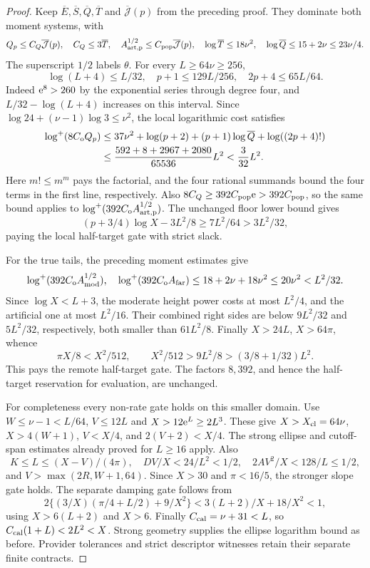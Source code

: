 \begin{proof}
Keep \(\overline E,\overline S,\overline Q,\overline T\) and
\(\overline{\mathcal J}(p)\) from the preceding proof.
They dominate both moment systems, with
\[
 Q_p\le C_Q\overline{\mathcal J}(p),\quad C_Q\le3\overline T,
 \quad A_{\rm art,p}^{1/2}\le C_{\rm pop}\overline{\mathcal J}(p),
 \quad \log\overline T\le18\nu^2,\quad
 \log\overline Q\le15+2\nu\le23\nu/4.
\]
The superscript \(1/2\) labels \(\theta\).
For every \(L\ge64\nu\ge256\),
\begin{equation}
 \log(L+4)\le L/32,\quad p+1\le129L/256,\quad
 2p+4\le65L/64.
 \label{eq:linear-elementary-bounds}
\end{equation}
Indeed \(\mathrm e^8>260\) by the exponential series through degree four,
and \(L/32-\log(L+4)\) increases on this interval.
Since \(\log24+(\nu-1)\log3\le\nu^2\),
the local logarithmic cost satisfies
\begin{align}
 \log^{+}(8C_{\mathrm o}Q_p)
 &\le37\nu^2+\log(p+2)+(p+1)\log\overline Q
                         +\log((2p+4)!)\nonumber\\
 &\le\frac{592+8+2967+2080}{65536}L^2
   <\frac3{32}L^2.
 \label{eq:linear-local-cost}
\end{align}
Here \(m!\le m^m\) pays the factorial, and the four rational
summands bound the four terms in the first line, respectively.
Also \(8C_Q\ge392C_{\rm pop}\mathrm e>392C_{\rm pop}\), so the same
bound applies to \(\log^{+}(392C_{\mathrm o}A_{\rm art,p}^{1/2})\).
The unchanged floor lower bound gives
\[
 (p+3/4)\log X-3L^2/8\ge7L^2/64>3L^2/32,
\]
paying the local half-target gate with strict slack.

For the true tails, the preceding moment estimates give
\[
 \log^{+}(392C_{\mathrm o}A_{\rm mod}^{1/2}),\quad
 \log^{+}(392C_{\mathrm o}A_{\rm far})
 \le18+2\nu+18\nu^2\le20\nu^2<L^2/32.
\]
Since \(\log X<L+3\), the moderate height power costs at most
\(L^2/4\), and the artificial one at most \(L^2/16\).
Their combined right sides are below \(9L^2/32\) and \(5L^2/32\),
respectively, both smaller than \(61L^2/8\).
Finally \(X>24L\), \(X>64\pi\), whence
\[
 \pi X/8<X^2/512,\qquad
 X^2/512>9L^2/8>(3/8+1/32)L^2.
\]
This pays the remote half-target gate. The factors \(8,392\),
and hence the half-target reservation for evaluation, are unchanged.

For completeness every non-rate gate holds on this smaller domain.
Use \(W\le\nu-1<L/64\), \(V\le12L\) and
\(X>12\mathrm e^L\ge2L^3\).
These give \(X>X_{\rm cl}=64\nu\), \(X>4(W+1)\),
\(V<X/4\), and \(2(V+2)<X/4\).
The strong ellipse and cutoff-span estimates already proved for
\(L\ge16\) apply. Also
\[
 K\le L\le(X-V)/(4\pi),\quad
 DV/X<24/L^2<1/2,\quad 2AV^2/X<128/L\le1/2,
\]
and \(V>\max(2R,W+1,64)\).
Since \(X>30\) and \(\pi<16/5\), the stronger slope gate holds.
The separate damping gate follows from
\[
 2\{(3/X)(\pi/4+L/2)+9/X^2\}
 <3(L+2)/X+18/X^2<1,
\]
using \(X>6(L+2)\) and \(X>6\).
Finally \(C_{\rm cal}=\nu+31<L\), so
\(C_{\rm cal}(1+L)<2L^2<X\).
Strong geometry supplies the ellipse logarithm bound as before.
Provider tolerances and strict descriptor witnesses retain their
separate finite contracts.


\end{proof}
